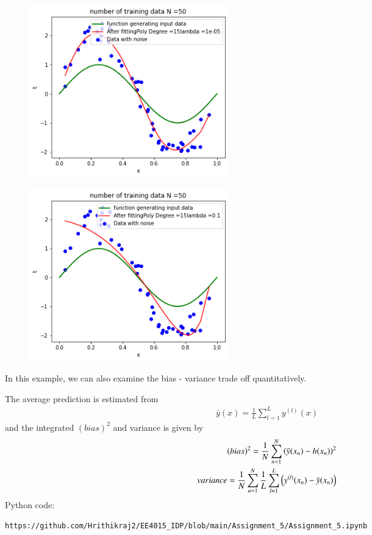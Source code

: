 \documentclass[journal,12pt,twocolumn]{IEEEtran}
\begin{document}
\begin{figure}[!h]
\begin{center}
\includegraphics[width=3.4in]{figs/fig4.png}
\end{center}
\caption{}
\label{fig:4}
\end{figure}

\begin{figure}[!h]
\begin{center}
\includegraphics[width=3.4in]{figs/fig5.png}
\end{center}
\caption{}
\label{fig:5}
\end{figure}

In this example, we can also examine the bias - variance trade off quantitatively.

The average prediction is estimated from
\begin{align}
    \bar y(x) = \frac{1}{L} \sum_{l=1}^{L} y^{(l)}(x)
\end{align}
and the integrated $(bias)^2$ and variance is given by
\begin{align}
    (bias)^2 = \frac{1}{N} \sum_{n=1}^{N} \left(\bar y(x_{n}) - h(x_{n})\right)^2\\
    variance = \frac{1}{N} \sum_{n=1}^{N} \frac{1}{L} \sum_{l=1}^{L} \left(y^{(l)}(x_{n}) - \bar y(x_{n})\right)
\end{align}
Python code:
\begin{lstlisting}
https://github.com/Hrithikraj2/EE4015_IDP/blob/main/Assignment_5/Assignment_5.ipynb
\end{lstlisting}
\end{document}
